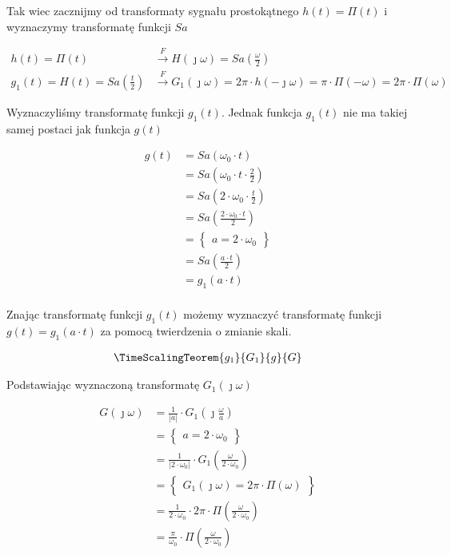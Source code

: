\begin{task}
Tak wiec zacznijmy od transformaty sygnału prostokątnego $h(t)=\Pi(t)$ i wyznaczymy transformatę funkcji $Sa$

\begin{align*}
h(t)=\Pi(t) &\overset{F}{\rightarrow} H(\jmath \omega) = Sa\left(\frac{\omega}{2}\right)\\
g_1(t) = H(t) = Sa\left(\frac{t}{2}\right) &\overset{F}{\rightarrow} 
G_1(\jmath \omega) = 2\pi \cdot h(- \jmath \omega) = \pi \cdot  \Pi\left(-\omega\right) = 2\pi \cdot  \Pi\left(\omega\right)
\end{align*}

Wyznaczyliśmy transformatę funkcji $g_1(t)$. Jednak funkcja $g_1(t)$ nie ma takiej samej postaci jak funkcja $g(t)$ 

\begin{align*}
g(t)&=Sa\left(\omega_0 \cdot t\right)\\
&=Sa\left(\omega_0 \cdot t \cdot \frac{2}{2}\right)\\
&=Sa\left(2\cdot \omega_0 \cdot \frac{t}{2}\right)\\
&=Sa\left(\frac{2\cdot \omega_0 \cdot t}{2}\right)\\
&=\begin{Bmatrix}
a = 2\cdot \omega_0
\end{Bmatrix}\\
&=Sa\left(\frac{a\cdot t}{2}\right)\\
&=g_1(a\cdot t) \\
\end{align*}

Znając transformatę funkcji $g_1(t)$ możemy wyznaczyć transformatę funkcji $g(t)=g_1(a \cdot t)$ za pomocą twierdzenia o zmianie skali.

\begin{align*}
\TimeScalingTeorem{g_1}{G_1}{g}{G}
\end{align*}

Podstawiając wyznaczoną transformatę $G_1(\jmath \omega)$

\begin{align*}
G(\jmath \omega) &= \frac{1}{\left|a\right|} \cdot G_1(\jmath \frac{\omega}{a})\\
&=\begin{Bmatrix}
a = 2\cdot \omega_0
\end{Bmatrix}\\
&=\frac{1}{\left| 2\cdot \omega_0 \right|} \cdot G_1( \frac{\omega}{2\cdot \omega_0})\\
&=\begin{Bmatrix}
G_1(\jmath \omega) = 2\pi \cdot \Pi\left(\omega\right)
\end{Bmatrix}\\
&=\frac{1}{ 2\cdot \omega_0 } \cdot 2\pi \cdot \Pi\left( \frac{\omega}{2\cdot \omega_0}\right)\\
&=\frac{\pi}{ \omega_0 } \cdot \Pi\left( \frac{\omega}{2\cdot \omega_0}\right)\\
\end{align*}


\end{task}
